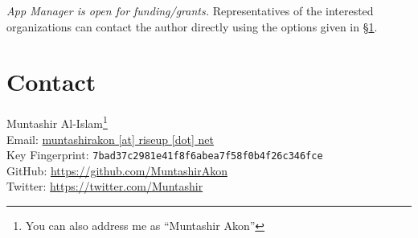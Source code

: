 \emph{App Manager is open for funding/grants.} Representatives of the interested organizations can contact the author
directly using the options given in §\cref{sec:contact}.

\section{Contact}\label{sec:contact} %
Muntashir Al-Islam\footnote{You can also address me as ``Muntashir Akon''}\\
Email: \href{mailto:muntashirakon@riseup.net}{muntashirakon [at] riseup [dot] net}\\
Key Fingerprint: \texttt{7bad37c2981e41f8f6abea7f58f0b4f26c346fce}\\
GitHub: \url{https://github.com/MuntashirAkon}\\
Twitter: \url{https://twitter.com/Muntashir}

